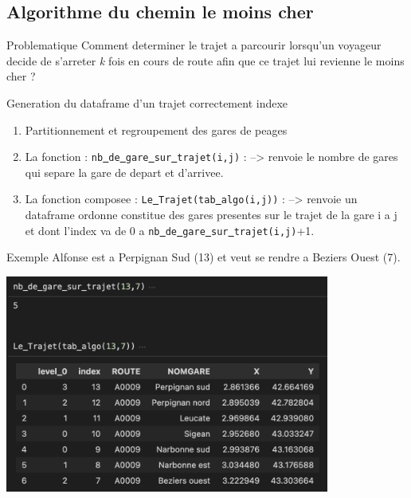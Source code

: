 \documentclass{beamer}
\begin{document}
\subsection{Algorithme du chemin le moins cher}
\begin{frame}{Problematique}
Comment determiner le trajet a parcourir lorsqu'un voyageur decide de s'arreter \textit{k} fois en cours de route afin que ce trajet lui revienne le moins cher ?
\end{frame}

\begin{frame}{Generation du dataframe d'un trajet correctement indexe} 
\begin{enumerate}
    \item Partitionnement et regroupement des gares de peages
    \item La fonction : \texttt{nb\underline{ }de\underline{ }gare\underline{ }sur\underline{ }trajet(i,j)} : \newline
    --> renvoie le nombre de gares qui separe la gare de depart et d'arrivee.
    \item La fonction composee : \texttt{Le\underline{ }Trajet(tab\underline{ }algo(i,j))} :\newline
    --> renvoie un dataframe ordonne constitue des gares presentes sur le trajet de la gare i a j et dont l'index va de 0 a \texttt{nb\underline{ }de\underline{ }gare\underline{ }sur\underline{ }trajet(i,j)}+1.
\end{enumerate}
\end{frame}

\begin{frame}{Exemple}
    Alfonse est a Perpignan Sud (13) et veut se rendre a Beziers Ouest (7).
    \begin{center}
        \includegraphics[width=0.8\textwidth]{Algo_1.png}
    \end{center}
\end{frame}
 
\end{document}
